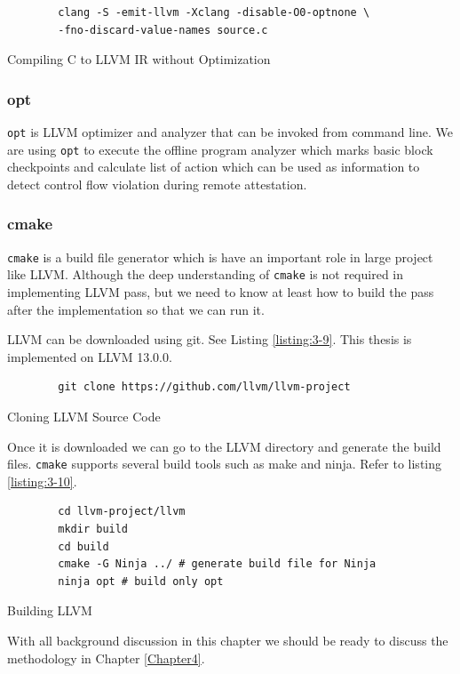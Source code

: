 \begin{listing}
    \begin{verbatim}
        clang -S -emit-llvm -Xclang -disable-O0-optnone \
        -fno-discard-value-names source.c
    \end{verbatim}
    \caption{Compiling C to LLVM IR without Optimization}    
    \label{listing:3-8}
\end{listing}

\subsubsection{opt}

\texttt{opt} is LLVM optimizer and analyzer that can be invoked from command line. We are using \texttt{opt} to execute the offline program analyzer which marks basic block checkpoints and calculate list of action which can be used as information to detect control flow violation during remote attestation.

\subsubsection{cmake}

\texttt{cmake} is a build file generator which is have an important role in large project like LLVM. Although the deep understanding of \texttt{cmake} is not required in implementing LLVM pass, but we need to know at least how to build the pass after the implementation so that we can run it.

LLVM can be downloaded using git. See Listing \ref{listing:3-9}. This thesis is implemented on LLVM 13.0.0.

\begin{listing}
    \begin{verbatim}
        git clone https://github.com/llvm/llvm-project
    \end{verbatim}
    \caption{Cloning LLVM Source Code}    
    \label{listing:3-9}
\end{listing}

Once it is downloaded we can go to the LLVM directory and generate the build files. \texttt{cmake} supports several build tools such as make and ninja. Refer to listing \ref{listing:3-10}.

\begin{listing}
    \begin{verbatim}
        cd llvm-project/llvm
        mkdir build
        cd build
        cmake -G Ninja ../ # generate build file for Ninja
        ninja opt # build only opt
    \end{verbatim}
\caption{Building LLVM}    
\label{listing:3-10}
\end{listing}

With all background discussion in this chapter we should be ready to discuss the methodology in Chapter \ref{Chapter4}.